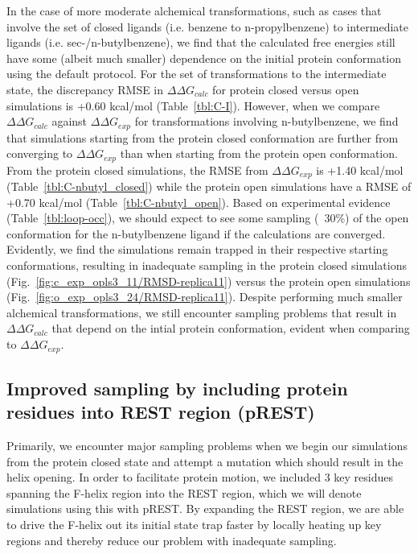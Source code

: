 \documentclass[journal=jctcce,manuscript=article]{achemso}
\begin{document}
In the case of more moderate alchemical transformations, such as cases that involve the set of closed ligands (i.e. benzene to n-propylbenzene) to intermediate ligands (i.e. sec-/n-butylbenzene), we find that the calculated free energies still have some (albeit much smaller) dependence on the initial protein conformation using the default protocol.
For the set of transformations to the intermediate state, the discrepancy RMSE in $\Delta\Delta G_{calc}$ for protein closed versus open simulations is +0.60 kcal/mol (Table~\ref{tbl:C-I}). 
However, when we compare $\Delta\Delta G_{calc}$ against $\Delta\Delta G_{exp}$ for transformations involving n-butylbenzene, we find that simulations starting from the protein closed conformation are further from converging to $\Delta\Delta G_{exp}$ than when starting from the protein open conformation.
From the protein closed simulations, the RMSE from $\Delta\Delta G_{exp}$ is +1.40 kcal/mol (Table~\ref{tbl:C-nbutyl_closed}) while the protein open simulations have a RMSE of +0.70 kcal/mol (Table~\ref{tbl:C-nbutyl_open}).
Based on experimental evidence (Table~\ref{tbl:loop-occ}), we should expect to see some sampling (~30\%) of the open conformation for the n-butylbenzene ligand if the calculations are converged.
Evidently, we find the simulations remain trapped in their respective starting conformations, resulting in inadequate sampling in the protein closed simulations (Fig.~\ref{fig:c_exp_opls3_11/RMSD-replica11}) versus the protein open simulations (Fig.~\ref{fig:o_exp_opls3_24/RMSD-replica11}).
Despite performing much smaller alchemical transformations, we still encounter sampling problems that result in $\Delta\Delta G_{calc}$ that depend on the intial protein conformation, evident when comparing to $\Delta\Delta G_{exp}$.

\subsection*{Improved sampling by including protein residues into REST region (pREST)}
Primarily, we encounter major sampling problems when we begin our simulations from the protein closed state and attempt a mutation which should result in the helix opening.
In order to facilitate protein motion, we included 3 key residues spanning the F-helix region into the REST region, which we will denote simulations using this with pREST. %
By expanding the REST region, we are able to drive the F-helix out its initial state trap faster by locally heating up key regions and thereby reduce our problem with inadequate sampling.
\end{document}
